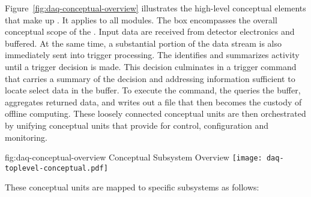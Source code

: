 Figure~\ref{fig:daq-conceptual-overview}  illustrates  the high-level conceptual elements that make up   . 
It applies to all  modules. 
The box %
encompasses the overall conceptual scope of the .
Input data are received from detector electronics and buffered. 
At the same time, a substantial portion of the data stream is also immediately sent into trigger processing. 
The  identifies and summarizes activity until a trigger decision is made. 
This decision culminates in a trigger command that carries a summary of the decision and addressing information sufficient to locate select data in the buffer.
To execute the command, the  queries the buffer, aggregates returned data, and writes out a file that then becomes the custody of offline computing.
These loosely connected conceptual units are then orchestrated by unifying conceptual units that provide for control, configuration and monitoring.

\begin{dunefigure}{fig:daq-conceptual-overview}{ Conceptual
    Subsystem Overview}
  \texttt{[image: daq-toplevel-conceptual.pdf]}
\end{dunefigure}

These conceptual units are mapped to specific  subsystems as follows:


